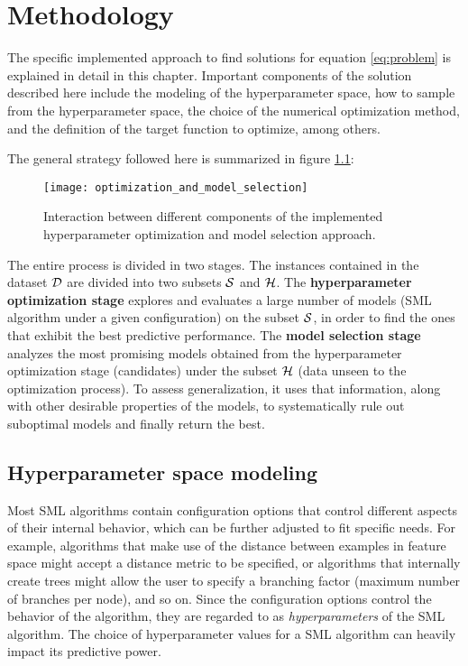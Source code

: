 \chapter{Methodology}
	The specific implemented approach to find solutions for equation \ref{eq:problem} is explained
	in detail in this chapter. Important components of the solution described here include the
	modeling of the hyperparameter space, how to sample from the hyperparameter space, the choice of the numerical optimization
	method, and the definition of the target function to optimize, among others.

	The general strategy followed here is summarized in figure \ref{fig:generalapproach}:

	\begin{figure}[here]
		\begin{center}
			\texttt{[image: optimization\_and\_model\_selection]}
		\end{center}
		\caption[General methodology diagram]{Interaction between different components of the
		implemented hyperparameter optimization and model selection approach.}
		\label{fig:generalapproach}
	\end{figure}


	The entire process is divided in two stages. The instances contained in the dataset
	$\mathcal{D}$ are divided into two subsets $\mathcal{S}$ and $\mathcal{H}$. The {\bf
	hyperparameter optimization stage} explores and evaluates a large number of models (SML algorithm under a
	given configuration) on the subset $\mathcal{S}$, in order to find the ones that exhibit the best
	predictive performance. The {\bf model selection stage} analyzes the most promising models obtained
	from the hyperparameter optimization stage (candidates) under the subset $\mathcal{H}$ (data unseen to the
	optimization process). To assess
	generalization, it uses that information, along with other desirable properties of the models,
	to systematically rule out suboptimal models and finally return the best.


\section{Hyperparameter space modeling}
	\label{sec:hyperparam_dist}
	Most SML algorithms contain configuration options that control different aspects of their
	internal behavior, which can be further adjusted to fit specific needs. For example, algorithms
	that make use of the distance between examples in feature space might accept a distance metric
	to be specified, or algorithms that internally create trees might allow the user to specify a
	branching factor (maximum number of branches per node), and so on. Since the configuration options control the behavior of the
	algorithm, they are regarded to as \emph{hyperparameters} of the SML algorithm. The choice of
	hyperparameter values for a SML algorithm can heavily impact its predictive power.

